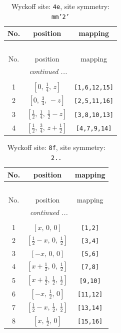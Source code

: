 \documentclass[fleqn,8pt]{jsarticle}
\begin{document}
\renewcommand{\arraystretch}{1.2}
\begin{longtable}{ccc}
\caption{Wyckoff site: {\tt 4e}, site symmetry: {\tt mm'2'}}
 \\
 \hline \hline
No. & position & mapping \\ \hline \endfirsthead

\multicolumn{2}{l}{\tablename\ \thetable{}} \\
 \hline \hline
No. & position & mapping \\ \hline \endhead

 \hline \hline
\multicolumn{2}{r}{\footnotesize\it continued ...} \\ \endfoot

 \hline \hline
\multicolumn{2}{r}{} \\ \endlastfoot

1 & $\left[ 0,\, \frac{1}{4},\, z \right]$ & {\tt [1,6,12,15]} \\ \hline
2 & $\left[ 0,\, \frac{3}{4},\, - z \right]$ & {\tt [2,5,11,16]} \\ \hline
3 & $\left[ \frac{1}{2},\, \frac{1}{4},\, \frac{1}{2} - z \right]$ & {\tt [3,8,10,13]} \\ \hline
4 & $\left[ \frac{1}{2},\, \frac{3}{4},\, z + \frac{1}{2} \right]$ & {\tt [4,7,9,14]} \\
\end{longtable}
\renewcommand{\arraystretch}{1.2}
\begin{longtable}{ccc}
\caption{Wyckoff site: {\tt 8f}, site symmetry: {\tt 2..}}
 \\
 \hline \hline
No. & position & mapping \\ \hline \endfirsthead

\multicolumn{2}{l}{\tablename\ \thetable{}} \\
 \hline \hline
No. & position & mapping \\ \hline \endhead

 \hline \hline
\multicolumn{2}{r}{\footnotesize\it continued ...} \\ \endfoot

 \hline \hline
\multicolumn{2}{r}{} \\ \endlastfoot

1 & $\left[ x,\, 0,\, 0 \right]$ & {\tt [1,2]} \\ \hline
2 & $\left[ \frac{1}{2} - x,\, 0,\, \frac{1}{2} \right]$ & {\tt [3,4]} \\ \hline
3 & $\left[ - x,\, 0,\, 0 \right]$ & {\tt [5,6]} \\ \hline
4 & $\left[ x + \frac{1}{2},\, 0,\, \frac{1}{2} \right]$ & {\tt [7,8]} \\ \hline
5 & $\left[ x + \frac{1}{2},\, \frac{1}{2},\, \frac{1}{2} \right]$ & {\tt [9,10]} \\ \hline
6 & $\left[ - x,\, \frac{1}{2},\, 0 \right]$ & {\tt [11,12]} \\ \hline
7 & $\left[ \frac{1}{2} - x,\, \frac{1}{2},\, \frac{1}{2} \right]$ & {\tt [13,14]} \\ \hline
8 & $\left[ x,\, \frac{1}{2},\, 0 \right]$ & {\tt [15,16]} \\
\end{longtable}
\end{document}
